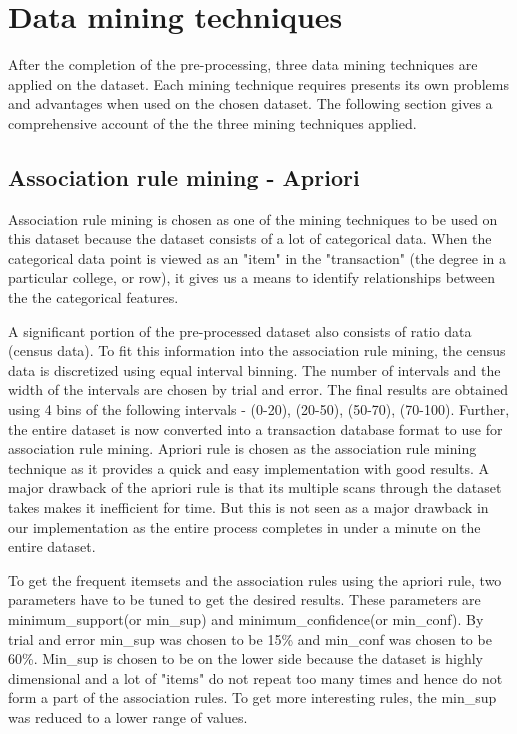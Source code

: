 \section{Data mining techniques}
After the completion of the pre-processing, three data mining techniques are applied on the dataset. Each mining technique requires presents its own problems and advantages when used on the chosen dataset. The following section gives a comprehensive account of the the three mining techniques applied. 

\subsection{Association rule mining - Apriori}
Association rule mining is chosen as one of the mining techniques to be used on this dataset because the dataset consists of a lot of categorical data. When the categorical data point is viewed as an "item" in the "transaction" (the degree in a particular college, or row), it gives us a means to identify relationships between the the categorical features. 

A significant portion of the pre-processed dataset also consists of ratio data (census data). To fit this information into the association rule mining, the census data is discretized using equal interval binning. The number of intervals and the width of the intervals are chosen by trial and error. The final results are obtained using 4 bins of the following intervals - (0-20), (20-50), (50-70), (70-100). Further, the entire dataset is now converted into a transaction database format to use for association rule mining. 
Apriori rule is chosen as the association rule mining technique as it provides a quick and easy implementation with good results. A major drawback of the apriori rule is that its multiple scans through the dataset takes makes it inefficient for time. But this is not seen as a major drawback in our implementation as the entire process completes in under a minute on the entire dataset.

To get the frequent itemsets and the association rules using the apriori rule, two parameters have to be tuned to get the desired results. These parameters are minimum\_support(or min\_sup) and minimum\_confidence(or min\_conf). By trial and error min\_sup was chosen to be 15\% and min\_conf was chosen to be 60\%. Min\_sup is chosen to be on the lower side because the dataset is highly dimensional and a lot of "items" do not repeat too many times and hence do not form a part of the association rules. To get more interesting rules, the min\_sup was reduced to a lower range of values.

